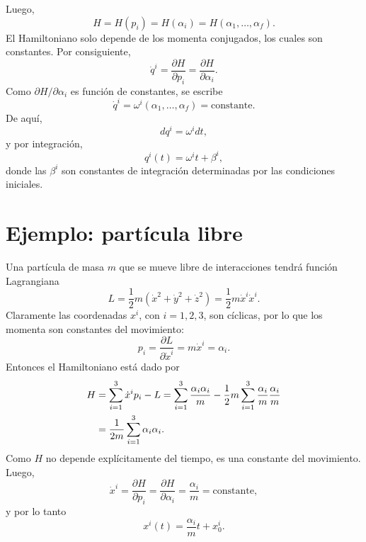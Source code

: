 \documentclass[../apunte_mecanica_clasica.tex]{subfiles}
\begin{document}
Luego,
\begin{equation}
    H=H(p_i)=H(\alpha_i)=H(\alpha_1,\ldots,\alpha_f).
    \label{eq:tc-h-alpha}
\end{equation}
El Hamiltoniano solo depende de los momenta conjugados, los cuales son constantes. Por consiguiente,
\begin{equation}
    \dot q^i=\frac{\partial H}{\partial p_i}
    =\frac{\partial H}{\partial \alpha_i}.
    \label{eq:tc-qdot-alpha}
\end{equation}
Como \(\partial H/\partial \alpha_i\) es función de constantes, se escribe
\begin{equation}
    \dot q^i=\omega^i(\alpha_1,\ldots,\alpha_f)=\text{constante}.
    \label{eq:tc-omega-constante}
\end{equation}
De aquí,
\begin{equation}
    dq^i=\omega^i dt,
    \label{eq:tc-dq-omega}
\end{equation}
y por integración,
\begin{equation}
    q^i(t)=\omega^i t+\beta^i,
    \label{eq:tc-solucion-lineal}
\end{equation}
donde las \(\beta^i\) son constantes de integración determinadas por las condiciones iniciales.

\section{Ejemplo: partícula libre}
\label{sec:tc-particula-libre}

Una partícula de masa \(m\) que se mueve libre de interacciones tendrá función Lagrangiana
\begin{equation}
    L=\frac{1}{2}m\left(\dot x^2+\dot y^2+\dot z^2\right)
    =\frac{1}{2}m\dot x^i\dot x^i.
    \label{eq:tc-libre-lagrangiano}
\end{equation}
Claramente las coordenadas \(x^i\), con \(i=1,2,3\), son cíclicas, por lo que los momenta son constantes del movimiento:
\begin{equation}
    p_i=\frac{\partial L}{\partial \dot x^i}=m\dot x^i=\alpha_i.
    \label{eq:tc-libre-momentum}
\end{equation}
Entonces el Hamiltoniano está dado por
\begin{align}
    H
    &=\sum_{i=1}^{3}\dot x^i p_i-L                                      
      =\sum_{i=1}^{3}\frac{\alpha_i\alpha_i}{m}
       -\frac{1}{2}m\sum_{i=1}^{3}\frac{\alpha_i}{m}\frac{\alpha_i}{m}      
       \notag\\
    &=\frac{1}{2m}\sum_{i=1}^{3}\alpha_i\alpha_i.
    \label{eq:tc-libre-hamiltoniano}
\end{align}
Como \(H\) no depende explícitamente del tiempo, es una constante del movimiento. Luego,
\begin{equation}
    \dot x^i=\frac{\partial H}{\partial p_i}
    =\frac{\partial H}{\partial \alpha_i}=\frac{\alpha_i}{m}=\text{constante},
    \label{eq:tc-libre-xdot}
\end{equation}
y por lo tanto
\begin{equation}
    x^i(t)=\frac{\alpha_i}{m}t+x_0^i.
    \label{eq:tc-libre-solucion}
\end{equation}
\end{document}
